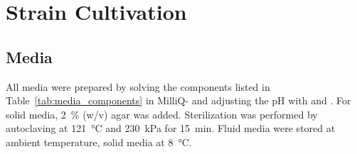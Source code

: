 \section{Strain Cultivation} %
\label{sec:strain_cultivation}

	\subsection{Media} %
	\label{sub:media}

	All media were prepared by solving the components listed in Table~\ref{tab:media_components} in MilliQ- and adjusting the pH with  and . For solid media, 2~\% (w/v) agar was added. Sterilization was performed by autoclaving at \SI{121}{\celsius} and \SI{230}{\kilo\pascal} for \SI{15}{\minute}. Fluid media were stored at ambient temperature, solid media at \SI{8}{\celsius}.

